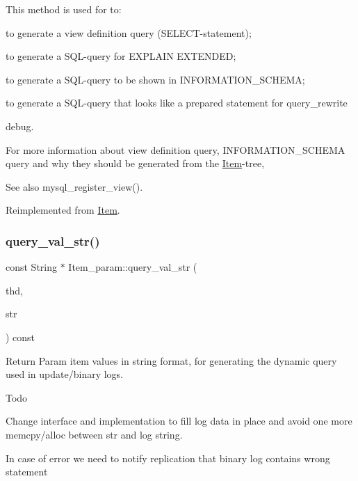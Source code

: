 This method is used for to\+:
\begin{DoxyItemize}
\item to generate a view definition query (S\+E\+L\+E\+CT-\/statement);
\item to generate a S\+QL-\/query for E\+X\+P\+L\+A\+IN E\+X\+T\+E\+N\+D\+ED;
\item to generate a S\+QL-\/query to be shown in I\+N\+F\+O\+R\+M\+A\+T\+I\+O\+N\+\_\+\+S\+C\+H\+E\+MA;
\item to generate a S\+QL-\/query that looks like a prepared statement for query\+\_\+rewrite
\item debug.
\end{DoxyItemize}

For more information about view definition query, I\+N\+F\+O\+R\+M\+A\+T\+I\+O\+N\+\_\+\+S\+C\+H\+E\+MA query and why they should be generated from the \mbox{\hyperlink{classItem}{Item}}-\/tree, \begin{DoxySeeAlso}{See also}
mysql\+\_\+register\+\_\+view(). 
\end{DoxySeeAlso}


Reimplemented from \mbox{\hyperlink{classItem_aa7ba4bde739d83adec8edf3bf1596d94}{Item}}.

\mbox{\label{classItem__param_aa9b9af6fd0ae3281fc3bbcd2ce6cf741}} 
\subsubsection{\texorpdfstring{query\+\_\+val\+\_\+str()}{query\_val\_str()}}
{\footnotesize\ttfamily const String $\ast$ Item\+\_\+param\+::query\+\_\+val\+\_\+str (\begin{DoxyParamCaption}\item[{T\+HD $\ast$}]{thd,  }\item[{String $\ast$}]{str }\end{DoxyParamCaption}) const}

Return Param item values in string format, for generating the dynamic query used in update/binary logs.

\begin{DoxyRefDesc}{Todo}
\item[\mbox{\hyperlink{todo__todo000028}{Todo}}]
\begin{DoxyItemize}
\item Change interface and implementation to fill log data in place and avoid one more memcpy/alloc between str and log string.
\item In case of error we need to notify replication that binary log contains wrong statement 
\end{DoxyItemize}\end{DoxyRefDesc}
\mbox{\label{classItem__param_a14ce171d7e839d9ebf57202fe1c9a80f}} 
